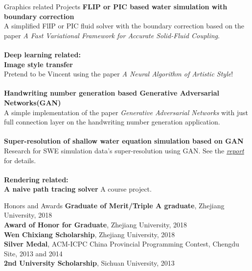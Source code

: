 \documentclass{resume} %
\makeatletter
\newcommand{\tabincell}[2]{\begin{tabular}{@{}#1@{}}#2\end{tabular}}
\makeatother
\begin{document}
\begin{rSection}{Graphics related Projects}
                {\bf FLIP or PIC based water simulation with boundary correction}\\A simplified FlIP or PIC fluid solver with the boundary correction based on the paper \emph{A Fast Variational Framework for Accurate Solid-Fluid Coupling}.\\\\
         \textbf{Deep learning related:}\\
                {\bf Image style transfer}\\Pretend to be Vincent using the paper \emph{A Neural Algorithm of Artistic Style}!\\\\
                {\bf Handwriting number generation based Generative Adversarial Networks(GAN)}\\ A simple implementation of the paper \emph{Generative Adversarial Networks} with just full connection layer on the handwriting number generation application.\\\\
                {\bf Super-resolution of shallow water equation simulation based on GAN}\\ Research for SWE simulation data's super-resolution using GAN. See the \emph{\href{https://wtyatzoo.github.io/reports/SWE.pdf}{report}} for details.   \\\\
        \textbf{Rendering related:}\\
                {\bf A naive path tracing solver} A course project.
                
         
\end{rSection}

\begin{rSection}{Honors and Awards}
  \textbf{Graduate of Merit/Triple A graduate}, Zhejiang University, 2018\\
  \textbf{Award of Honor for Graduate}, Zhejiang University, 2018\\
  \textbf{Wen Chixiang Scholarship}, Zhejiang University, 2018\\
  \textbf{Silver Medal}, ACM-ICPC China Provincial Programming Contest, Chengdu Site, 2013 and 2014\\
  \textbf{2nd University Scholarship}, Sichuan University, 2013
\end{rSection}

{}
\end{document}

